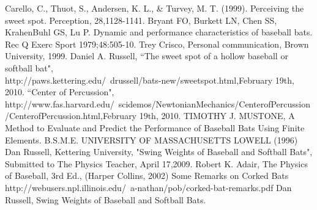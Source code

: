 \begin{thebibliography}{99}

Carello, C., Thuot, S., Andersen, K. L., \& Turvey, M. T. (1999). Perceiving the sweet spot. Perception, 28,1128-1141.
Bryant FO, Burkett LN, Chen SS, KrahenBuhl GS, Lu P. Dynamic and performance characteristics of baseball bats. Rec Q Exerc Sport 1979;48:505-10.
Trey Crisco, Personal communication, Brown University, 1999.
 Daniel A. Russell, ``The sweet spot of a hollow baseball or softball bat",\\http://paws.kettering.edu/~drussell/bats-new/sweetspot.html,February 19th, 2010.
 ``Center of Percussion",\\
http://www.fas.harvard.edu/~scidemos/NewtonianMechanics/CenterofPercussion/CenterofPercussion.html,February 19th, 2010.
 TIMOTHY J. MUSTONE, A Method to Evaluate and Predict the Performance of Baseball Bats Using Finite Elements. B.S.M.E. UNIVERSITY OF MASSACHUSETTS LOWELL (1996)
 Dan Russell, Kettering University, "Swing Weights of Baseball
and Softball Bats", Submitted to The Physics Teacher, April 17,2009.
 Robert K. Adair, The Physics of Baseball, 3rd Ed., (Harper Collins, 2002)
 Some Remarks on Corked Bats \\
http://webusers.npl.illinois.edu/~a-nathan/pob/corked-bat-remarks.pdf
  Dan Russell, Swing Weights of Baseball and Softball Bats.
\end{thebibliography}
